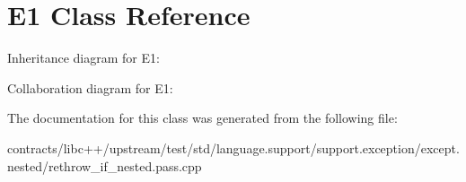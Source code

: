 \hypertarget{class_e1}{}\section{E1 Class Reference}
\label{class_e1}


Inheritance diagram for E1\+:


Collaboration diagram for E1\+:


The documentation for this class was generated from the following file\+:\begin{DoxyCompactItemize}
\item 
contracts/libc++/upstream/test/std/language.\+support/support.\+exception/except.\+nested/rethrow\+\_\+if\+\_\+nested.\+pass.\+cpp\end{DoxyCompactItemize}
